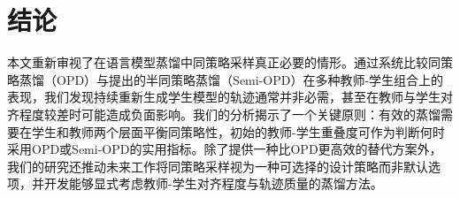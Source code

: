 \vspace{-2mm}

\section{结论}
\vspace{-2mm}


本文重新审视了在语言模型蒸馏中同策略采样真正必要的情形。通过系统比较同策略蒸馏（OPD）与提出的半同策略蒸馏（Semi-OPD）在多种教师-学生组合上的表现，我们发现持续重新生成学生模型的轨迹通常并非必需，甚至在教师与学生对齐程度较差时可能造成负面影响。我们的分析揭示了一个关键原则：有效的蒸馏需要在学生和教师两个层面平衡同策略性，初始的教师-学生重叠度可作为判断何时采用OPD或Semi-OPD的实用指标。除了提供一种比OPD更高效的替代方案外，我们的研究还推动未来工作将同策略采样视为一种可选择的设计策略而非默认选项，并开发能够显式考虑教师-学生对齐程度与轨迹质量的蒸馏方法。


